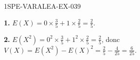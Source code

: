 \begin{corrige}{1SPE-VARALEA-EX-039}

\textbf{1.} $E(X)=0\times\frac35+1\times\frac25=\frac25$.

\textbf{2.} $E(X^2)=0^2\times\frac35+1^2\times\frac25=\frac25$, donc
$V(X)=E(X^2)-E(X)^2=\frac25-\frac4{25}=\frac6{25}$.

\end{corrige}
